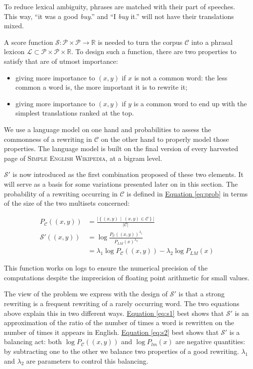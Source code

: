 \documentclass[a4paper, 11pt, onepage]{scrreprt}
\newcommand\sew{\textsc{Simple English Wikipedia}}
\newcommand\equaref[1]{\hyperref[#1]{Equation \ref*{#1}}}
\newcommand\card[1]{\lvert #1 \rvert}
\newcommand\suchthat{\, \middle| \,}
\newcommand\proba[2][]{P_{#1} \left( #2 \right)}
\begin{document}
To reduce lexical ambiguity, phrases are matched with their part of
speeches. This way, “it was a good \emph{buy}.” and “I \emph{buy} it.”
will not have their translations mixed.

A score function $\mathcal{S} : \mathcal{P} \times \mathcal{P}
\rightarrow \mathbb{R}$ is needed to turn the corpus $\mathcal{C}$
into a phrasal lexicon $\mathcal{L} \subset \mathcal{P} \times
\mathcal{P} \times \mathbb{R}$. To design such a function, there are
two properties to satisfy that are of utmost importance:

\begin{itemize}
\item giving more importance to $(x, y)$ if $x$ is not a common word:
  the less common a word is, the more important it is to rewrite it;
\item giving more importance to $(x, y)$ if $y$ is a common word to
  end up with the simplest translations ranked at the top.
\end{itemize}

We use a language model on one hand and probabilities to assess the
commonness of a rewriting in $\mathcal{C}$ on the other hand to
properly model those properties. The language model is built on the
final version of every harvested page of \sew, at a bigram level.

$\mathcal{S'}$ is now introduced as the first combination proposed of
these two elements. It will serve as a basis for some variations
presented later on in this section. The probability of a rewriting
occurring in $\mathcal{C}$ is defined in \equaref{eq:prob} in terms of
the size of the two multisets concerned:

\begin{align}
  \label{eq:prob}
  \proba[\mathcal{C}]{(x, y)} & = \frac{\card{\left\{(x, y) \suchthat
        (x, y) \in \mathcal{C}\right\}}}{\card{\mathcal{C}}} \\
  \label{eq:s1}
  \mathcal{S'}((x, y)) & = \log \frac{\proba[\mathcal{C}]{(x, y)}^{\lambda_1}}%
  {\proba[LM]{x}^{\lambda_2}} \\
  \label{eq:s2}
  & = \lambda_1 \log \proba[\mathcal{C}]{(x, y)} - \lambda_2 \log \proba[LM]{x}
\end{align}

This function works on logs to ensure the numerical precision of the
computations despite the imprecision of floating point arithmetic for
small values.

The view of the problem we express with the design of $\mathcal{S'}$
is that a strong rewriting is a frequent rewriting of a rarely
occurring word. The two equations above explain this in two different
ways. \equaref{eq:s1} best shows that $\mathcal{S'}$ is an
approximation of the ratio of the number of times a word is rewritten
on the number of times it appears in English. \equaref{eq:s2} best
shows that $\mathcal{S'}$ is a balancing act: both $\log
\proba[\mathcal{C}]{(x, y)}$ and $\log \proba[lm]{x}$ are negative
quantities: by subtracting one to the other we balance two properties
of a good rewriting. $\lambda_1$ and $\lambda_2$ are parameters to
control this balancing.
\end{document}

